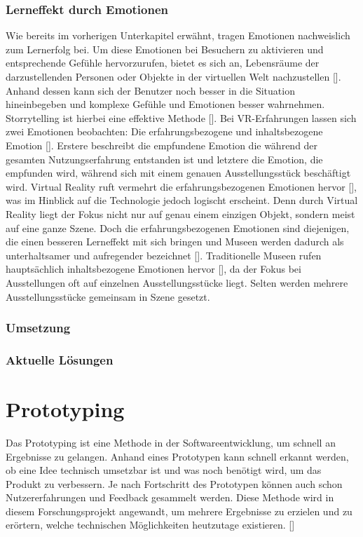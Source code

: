 \documentclass[a4paper,12pt,oneside]{article}
\begin{document}
      \subsubsection{Lerneffekt durch Emotionen}
        Wie bereits im vorherigen Unterkapitel erwähnt, tragen Emotionen nachweislich zum
        Lernerfolg bei. Um diese Emotionen bei Besuchern zu aktivieren und entsprechende
        Gefühle hervorzurufen, bietet es sich an, Lebensräume der darzustellenden Personen
        oder Objekte in der virtuellen Welt nachzustellen [\cite[35-36]{Heidsiek2019}].
        Anhand dessen kann sich der Benutzer noch besser in die Situation hineinbegeben
        und komplexe Gefühle und Emotionen besser wahrnehmen. Storrytelling ist hierbei
        eine effektive Methode [\cite[35-39]{Heidsiek2019}].
        Bei VR-Erfahrungen lassen sich zwei Emotionen beobachten: Die erfahrungsbezogene
        und inhaltsbezogene Emotion [\cite[69]{Heidsiek2019}]. Erstere beschreibt die
        empfundene Emotion die während der gesamten Nutzungserfahrung entstanden ist und
        letztere die Emotion, die empfunden wird, während sich mit einem genauen
        Ausstellungsstück beschäftigt wird. Virtual Reality ruft vermehrt die 
        erfahrungsbezogenen Emotionen hervor [\cite[69]{Heidsiek2019}], was im Hinblick auf
        die Technologie jedoch logischt erscheint. Denn durch Virtual Reality liegt der
        Fokus nicht nur auf genau einem einzigen Objekt, sondern meist auf eine ganze
        Szene. Doch die erfahrungsbezogenen Emotionen sind diejenigen, die einen besseren
        Lerneffekt mit sich bringen und Museen werden dadurch als unterhaltsamer und
        aufregender bezeichnet [\cite[69]{Heidsiek2019}]. Traditionelle Museen rufen 
        hauptsächlich inhaltsbezogene Emotionen hervor [\cite[69]{Heidsiek2019}], da der
        Fokus bei Ausstellungen oft auf einzelnen Ausstellungsstücke liegt. Selten werden
        mehrere Ausstellungsstücke gemeinsam in Szene gesetzt.
      \subsubsection{Umsetzung}

      \subsubsection{Aktuelle Lösungen}
  \section{Prototyping}
    Das Prototyping ist eine Methode in der Softwareentwicklung, um schnell an
    Ergebnisse zu gelangen. Anhand eines Prototypen kann schnell erkannt werden,
    ob eine Idee technisch umsetzbar ist und was noch benötigt wird, um das Produkt
    zu verbessern. Je nach Fortschritt des Prototypen können auch schon Nutzererfahrungen
    und Feedback gesammelt werden.
    Diese Methode wird in diesem Forschungsprojekt angewandt, um mehrere Ergebnisse
    zu erzielen und zu erörtern, welche technischen Möglichkeiten heutzutage existieren.
    [\cite{Bertsche2007}]
\end{document}
